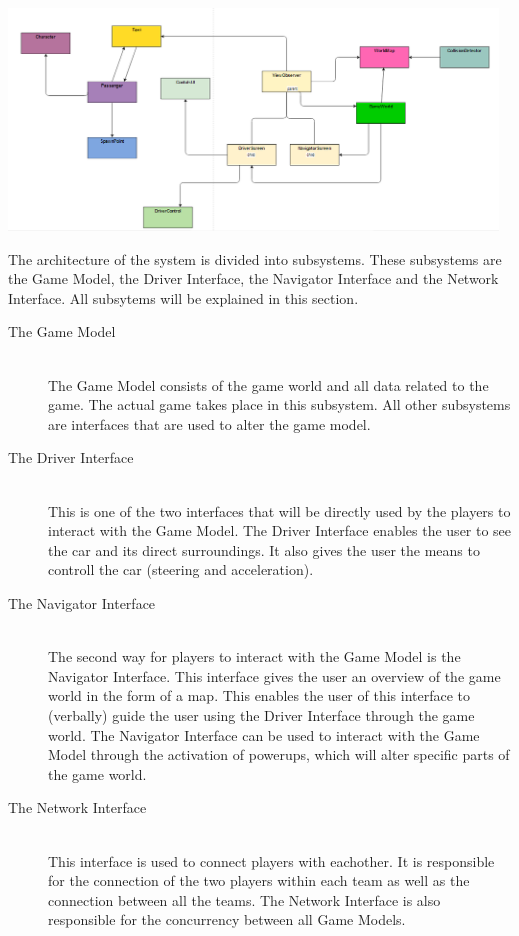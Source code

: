 
\begin{center}
	 \includegraphics[width=130mm]{./images/UML2.png}

\end{center}


The architecture of the system is divided into subsystems. These subsystems are the Game Model, the Driver Interface, the Navigator Interface and the Network Interface. All subsytems will be explained in this section.

\begin{description}
	
\item[The Game Model] \hfill \\
The Game Model consists of the game world and all data related to the game. The actual game takes place in this subsystem. All other subsystems are interfaces that are used to alter the game model.

\item[The Driver Interface]  \hfill \\
This is one of the two interfaces that will be directly used by the players to interact with the Game Model. The Driver Interface enables the user to see the car and its direct surroundings. It also gives the user the means to controll the car (steering and acceleration). 

\item[The Navigator Interface]  \hfill \\
The second way for players to interact with the Game Model is the Navigator Interface. This interface gives the user an overview of the game world in the form of a map. This enables the user of this interface to (verbally) guide the user using the Driver Interface through the game world. The Navigator Interface can be used to interact with the Game Model through the activation of powerups, which will alter specific parts of the game world.

\item[The Network Interface]  \hfill \\
This interface is used to connect players with eachother. It is responsible for the connection of the two players within each team as well as the connection between all the teams. The Network Interface is also responsible for the concurrency between all Game Models.

\end{description}
